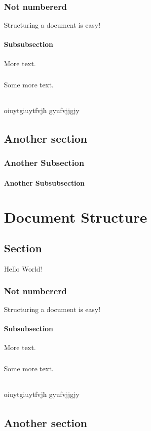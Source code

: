 \documentclass{book}
\begin{document}
	\subsection*{Not numbererd}
	Structuring a document is easy!
	\subsubsection{Subsubsection}
	More text.
	\paragraph{}
	Some more text.
	\subparagraph{}
	oiuytgiuytfvjh gyufvjjgjy
	
	\subparagraph{}
	\lipsum[1]
	\section{Another section}
	\subsection{Another Subsection}
	\subsubsection{Another Subsubsection}
	\lipsum[1-3]\chapter{Document Structure}
	\section{Section}
	Hello World!
	\subsection*{Not numbererd}
	Structuring a document is easy!
	\subsubsection{Subsubsection}
	More text.
	\paragraph{}
	Some more text.
	\subparagraph{}
	oiuytgiuytfvjh gyufvjjgjy
	
	\subparagraph{}
	\lipsum[1]
	\section{Another section}
\end{document}
